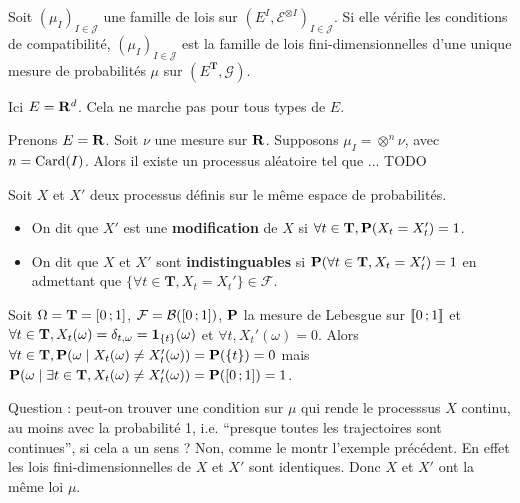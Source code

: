 	\begin{thm}
		Soit $(\mu_I)_{I \in \mathcal{J}}$ une famille de lois sur $\left( E^I, \mathcal{E}^{\otimes I} \right)_{I \in \mathcal{J}}$.
		Si elle vérifie les conditions de compatibilité, $(\mu_I)_{I \in \mathcal{J}}$ est la famille de lois fini-dimensionnelles d'une unique mesure de probabilités $\mu$ sur $\left( E^{\mathbf{T}}, \mathcal{G} \right)$.
	\end{thm}
	
	{\Large \noindent\lightning} Ici $E = \mathbf{R}^d$. Cela ne marche pas pour tous types de $E$.
	
	\begin{ex}
		Prenons $E = \mathbf{R}$.
		Soit $\nu$ une mesure sur $\mathbf{R}$.
		Supposons $\mu_I = \otimes^n \nu$, avec $n = \operatorname{Card}(I)$.
		Alors il existe un processus aléatoire tel que ...
		TODO
	\end{ex}
	
	\begin{defn}
		Soit $X$ et $X'$ deux processus définis sur le même espace de probabilités.
		\begin{itemize}
			\item[\textbullet] On dit que $X'$ est une \textbf{modification} de $X$ si $\forall t \in \mathbf{T}, \mathbf{P}(X_t = X_t') = 1$.
			\item[\textbullet] On dit que $X$ et $X'$ sont \textbf{indistinguables} si $\mathbf{P}(\forall t \in \mathbf{T}, X_t = X_t') = 1$ en admettant que $\{ \forall t \in \mathbf{T}, X_t = X_t' \} \in \mathcal{F}$.
		\end{itemize}
	\end{defn}
	
	\begin{ex}
		Soit $\Omega = \mathbf{T} = \mathopen{[}0\mathclose{}\mathpunct{};1\mathclose{]}$, $\mathcal{F} = \mathcal{B}(\mathopen{[}0\mathclose{}\mathpunct{};1\mathclose{]})$, $\mathbf{P}$ la mesure de Lebesgue sur $\mathopen{[\![}0\mathclose{}\mathpunct{};1\mathclose{]\!]}$ et $\forall t \in \mathbf{T}, X_t(\omega) = \delta_{t,\omega} = \operatorname{\mathbf{1}}_{ \{ t \} }(\omega)$ et $\forall t, X_t'(\omega) = 0$.
		Alors $\forall t \in \mathbf{T}, \mathbf{P}( \omega \mid X_t(\omega) \neq X_t'(\omega) ) = \mathbf{P}( \{ t \} ) = 0$ mais $\mathbf{P}( \omega \mid \exists t \in \mathbf{T}, X_t(\omega) \neq X_t'(\omega) ) = \mathbf{P}(\mathopen{[}0\mathclose{}\mathpunct{};1\mathclose{]}) = 1$.
	\end{ex}
	
	Question : peut-on trouver une condition sur $\mu$ qui rende le processsus $X$ continu, au moins avec la probabilité 1, i.e. “presque toutes les trajectoires sont continues”, si cela a un sens ?
	Non, comme le montr l'exemple précédent.
	En effet les lois fini-dimensionnelles de $X$ et $X'$ sont identiques.
	Donc $X$ et $X'$ ont la même loi $\mu$.
	
